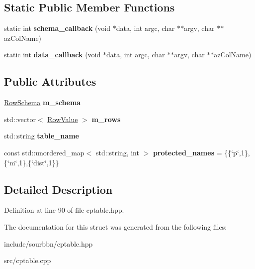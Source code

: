 \subsection*{Static Public Member Functions}
\begin{DoxyCompactItemize}
\item 
\mbox{\label{structsourbbn_1_1CPTable_a8b9a998b6c9f03e035a16b8b300a1f93}} 
static int {\bfseries schema\+\_\+callback} (void $\ast$data, int argc, char $\ast$$\ast$argv, char $\ast$$\ast$az\+Col\+Name)
\item 
\mbox{\label{structsourbbn_1_1CPTable_abcfc4ec8b891c9c4bae1d8d1ca85d528}} 
static int {\bfseries data\+\_\+callback} (void $\ast$data, int argc, char $\ast$$\ast$argv, char $\ast$$\ast$az\+Col\+Name)
\end{DoxyCompactItemize}
\subsection*{Public Attributes}
\begin{DoxyCompactItemize}
\item 
\mbox{\label{structsourbbn_1_1CPTable_ae0601adf81fe798848d3a39a21945a26}} 
\hyperlink{classsourbbn_1_1RowSchema}{Row\+Schema} {\bfseries m\+\_\+schema}
\item 
\mbox{\label{structsourbbn_1_1CPTable_aa9ba48439d7b426f69530d383a9f53f8}} 
std\+::vector$<$ \hyperlink{classsourbbn_1_1RowValue}{Row\+Value} $>$ {\bfseries m\+\_\+rows}
\item 
\mbox{\label{structsourbbn_1_1CPTable_a2bdd82dafd989d93b49a94f599782d16}} 
std\+::string {\bfseries table\+\_\+name}
\item 
\mbox{\label{structsourbbn_1_1CPTable_a1712ff346b06c75056f6736633042551}} 
const std\+::unordered\+\_\+map$<$ std\+::string, int $>$ {\bfseries protected\+\_\+names} = \{\{\char`\"{}p\char`\"{},1\},\{\char`\"{}m\char`\"{},1\},\{\char`\"{}dist\char`\"{},1\}\}
\end{DoxyCompactItemize}


\subsection{Detailed Description}


Definition at line 90 of file cptable.\+hpp.



The documentation for this struct was generated from the following files\+:\begin{DoxyCompactItemize}
\item 
include/sourbbn/cptable.\+hpp\item 
src/cptable.\+cpp\end{DoxyCompactItemize}
